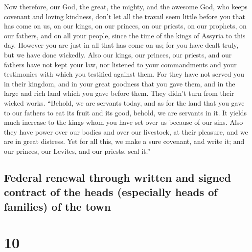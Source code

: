  Now therefore, our God, the great, the mighty, and the
awesome God, who keeps covenant and loving kindness, don't let all the
travail seem little before you that has come on us, on our kings, on our
princes, on our priests, on our prophets, on our fathers, and on all
your people, since the time of the kings of Assyria to this day.
 However you are just in all that has come on us; for you
have dealt truly, but we have done wickedly.  Also our
kings, our princes, our priests, and our fathers have not kept your law,
nor listened to your commandments and your testimonies with which you
testified against them.  For they have not served you in
their kingdom, and in your great goodness that you gave them, and in the
large and rich land which you gave before them. They didn't turn from
their wicked works.  ``Behold, we are servants today, and
as for the land that you gave to our fathers to eat its fruit and its
good, behold, we are servants in it.  It yields much
increase to the kings whom you have set over us because of our sins.
Also they have power over our bodies and over our livestock, at their
pleasure, and we are in great distress.  Yet for all
this, we make a sure covenant, and write it; and our princes, our
Levites, and our priests, seal it.''

\hypertarget{federal-renewal-through-written-and-signed-contract-of-the-heads-especially-heads-of-families-of-the-town}{%
\subsection{Federal renewal through written and signed contract of the
heads (especially heads of families) of the
town}\label{federal-renewal-through-written-and-signed-contract-of-the-heads-especially-heads-of-families-of-the-town}}

\hypertarget{section-9}{%
\section{10}\label{section-9}}

